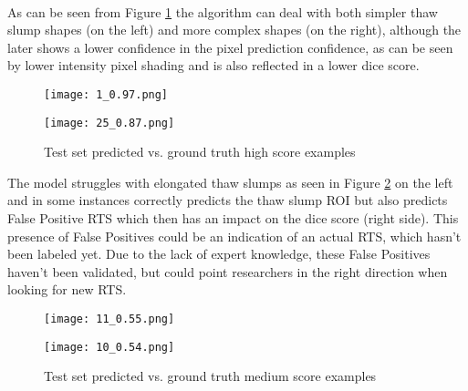\paragraph{}
As can be seen from Figure \ref{high_score_pic} the algorithm can deal with both simpler thaw slump shapes (on the left) and more complex shapes (on the right), although the later shows a lower confidence in the pixel prediction confidence, as can be seen by lower intensity pixel shading and is also reflected in a lower dice score.

    \begin{figure}[hbt!]
        \begin{minipage}[c]{0.55\linewidth}
        \texttt{[image: 1\_0.97.png]}
        \label{best_dice}
        \end{minipage}
            \hfill
            \begin{minipage}[c]{0.55\linewidth}
            \texttt{[image: 25\_0.87.png]}
            \label{high_score_pic}
        \end{minipage}
        \caption{Test set predicted vs. ground truth high score examples}
    \end{figure}

The model struggles with elongated thaw slumps as seen in Figure \ref{medium_score_pic} on the left and in some instances correctly predicts the thaw slump \gls{ROI} but also predicts False Positive \gls{RTS} which then has an impact on the dice score (right side). This presence of False Positives could be an indication of an actual \gls{RTS}, which hasn't been labeled yet. Due to the lack of expert knowledge, these False Positives haven't been validated, but could point researchers in the right direction when looking for new \gls{RTS}.

    \begin{figure}[hbt!]
        \begin{minipage}[c]{0.55\linewidth}
        \texttt{[image: 11\_0.55.png]}
        \label{best_dice}
        \end{minipage}
            \hfill
            \begin{minipage}[c]{0.55\linewidth}
            \texttt{[image: 10\_0.54.png]}
            \label{medium_score_pic}
        \end{minipage}
        \caption{Test set predicted vs. ground truth medium score examples}
    \end{figure}

